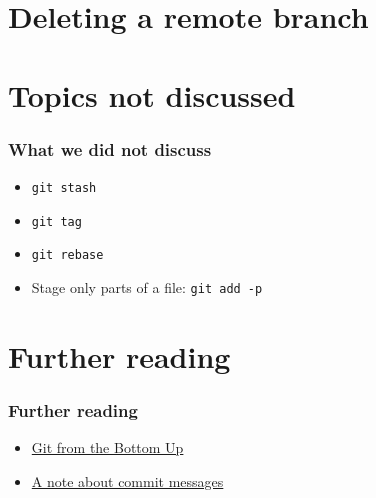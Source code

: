 \documentclass{gittalk}
\newcommand{\hlcommand}[1]{%
\colorbox{base3}{\small \texttt{#1}}
}
\begin{document}
\section{Deleting a remote branch}


\section{Topics not discussed}

\begin{frame}
\frametitle{What we did not discuss}
\begin{itemize}
  \item \hlcommand{git stash}
  \item \hlcommand{git tag}
  \item \hlcommand{git rebase}
  \item Stage only parts of a file: \texttt{git add -p}
\end{itemize}
\end{frame}

\section{Further reading}

\begin{frame}
\frametitle{Further reading}
\begin{itemize}
    \item \href{http://jwiegley.github.io/git-from-the-bottom-up/}{Git from the Bottom Up}
    \item \href{http://tbaggery.com/2008/04/19/a-note-about-git-commit-messages.html}
               {A note about commit messages}
\end{itemize}
\end{frame}
\end{document}
